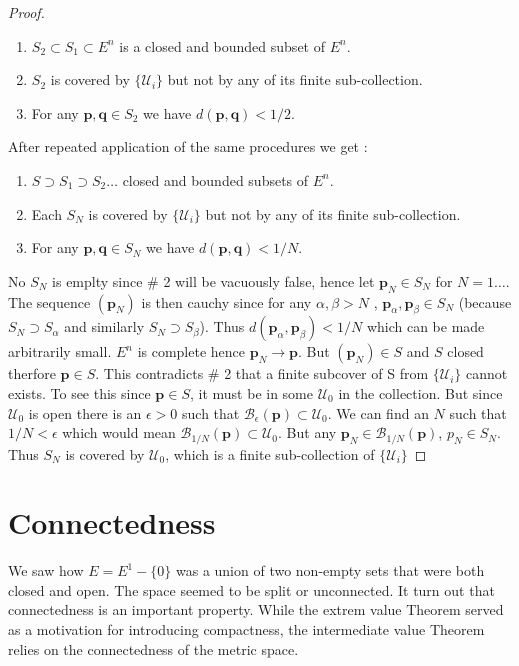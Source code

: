 \begin{proof}
	\begin{enumerate}
	    \item $S_2 \subset S_1 \subset E^n$ is a closed and bounded subset of $E^n$.
	    \item $S_2$ is covered by $\left.\lbrace\mathcal{U}_i\rbrace\right.$ but not by any of 
		its finite sub-collection.
	    \item For any $\mathbf{p},\mathbf{q} \in S_2$ we have $d(\mathbf{p},\mathbf{q}) < 1/2$.
	\end{enumerate}

	After repeated application of the same procedures we get :

	\begin{enumerate}
	    \item $S \supset S_1 \supset S_2 \dots $ closed and bounded subsets of $E^n$.
	    \item Each $S_N$ is covered by $\left.\lbrace\mathcal{U}_i\rbrace\right.$ but not by 
		any of its finite sub-collection.
	    \item For any $\mathbf{p},\mathbf{q} \in S_N$ we have $d(\mathbf{p},\mathbf{q}) < 1/N$.
	\end{enumerate}
	No $S_N$ is emplty since \# 2 will be vacuously false, hence let $\mathbf{p}_N \in S_N$ for
	$N = 1 \dots $. The sequence $\left(\mathbf{p}_N\right)$ is then cauchy since for any $\alpha,\beta
	> N$ , $\mathbf{p}_{\alpha},\mathbf{p}_{\beta} \in S_N$ (because $S_N \supset S_{\alpha}$ 
	and similarly $S_N \supset S_{\beta}$). Thus $d(\mathbf{p}_{\alpha},\mathbf{p}_{\beta}) <
	1/N$ which can be made arbitrarily small. $E^n$ is complete hence $\mathbf{p}_N \rightarrow
        \mathbf{p}$. But $\left(\mathbf{p}_N\right) \in S$ and $S$ closed therfore $\mathbf{p} \in S$.
	This contradicts \# 2 that a finite subcover of S from $\left.\lbrace\mathcal{U}_i\rbrace\right.$
	cannot exists. To see this since $\mathbf{p} \in S$, it must be in some $\mathcal{U}_0$ in
	the collection. But since $\mathcal{U}_0$ is open there is an $\epsilon > 0$ such that
	$\mathcal{B}_{\epsilon}(\mathbf{p}) \subset \mathcal{U}_0$. We can find an $N$ such that
	$1/N < \epsilon$ which would mean $\mathcal{B}_{1/N}(\mathbf{p}) \subset \mathcal{U}_0$. But
	any $\mathbf{p}_N \in \mathcal{B}_{1/N}(\mathbf{p})$, $p_N \in S_N$. Thus
	$S_N$ is covered by $\mathcal{U}_0$, which is a finite sub-collection of $\left.
	    \lbrace\mathcal{U}_i\rbrace\right.$ 

\end{proof}
\section{Connectedness}
We saw how $E = E^1 - \lbrace 0 \rbrace $ was a union of two non-empty sets that were both closed
and open. The space seemed to be split or unconnected. It turn out that connectedness is an
important property. While the extrem value Theorem served as a motivation for introducing
compactness, the intermediate value Theorem relies on the connectedness of the metric space. 

